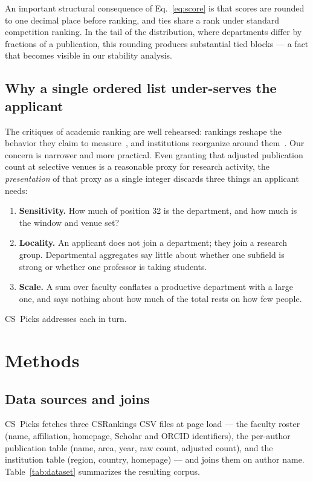 \documentclass[11pt]{article}
\newcommand{\sys}{CS~Picks}
\newcommand{\csr}{CSRankings}
\begin{document}
An important structural consequence of Eq.~\ref{eq:score} is that scores are
rounded to one decimal place before ranking, and ties share a rank under
standard competition ranking. In the tail of the distribution, where
departments differ by fractions of a publication, this rounding produces
substantial tied blocks --- a fact that becomes visible in our stability
analysis.

\subsection{Why a single ordered list under-serves the applicant}

The critiques of academic ranking are well rehearsed: rankings reshape the
behavior they claim to measure~\cite{goodhart}, and institutions reorganize
around them~\cite{usnews}. Our concern is narrower and more practical. Even
granting that adjusted publication count at selective venues is a reasonable
proxy for research activity, the \emph{presentation} of that proxy as a single
integer discards three things an applicant needs:

\begin{enumerate}
  \item \textbf{Sensitivity.} How much of position 32 is the department, and
    how much is the window and venue set?
  \item \textbf{Locality.} An applicant does not join a department; they join a
    research group. Departmental aggregates say little about whether one
    subfield is strong or whether one professor is taking students.
  \item \textbf{Scale.} A sum over faculty conflates a productive department
    with a large one, and says nothing about how much of the total rests on how
    few people.
\end{enumerate}

\sys{} addresses each in turn.

\section{Methods}
\label{sec:methods}

\subsection{Data sources and joins}

\sys{} fetches three \csr{} CSV files at page load --- the faculty roster
(name, affiliation, homepage, Scholar and ORCID identifiers), the per-author
publication table (name, area, year, raw count, adjusted count), and the
institution table (region, country, homepage) --- and joins them on author
name. Table~\ref{tab:dataset} summarizes the resulting corpus.
\end{document}

